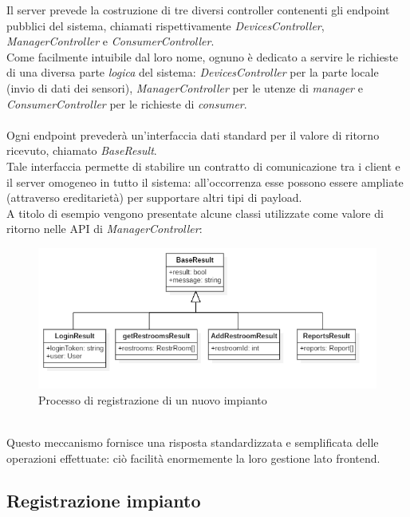 \documentclass[12pt]{article}
\begin{document}
Il server prevede la costruzione di tre diversi controller contenenti gli endpoint pubblici del sistema, chiamati rispettivamente \textit{DevicesController}, \textit{ManagerController} e \textit{ConsumerController}.\\
Come facilmente intuibile dal loro nome, ognuno è dedicato a servire le richieste di una diversa parte \textit{logica} del sistema: \textit{DevicesController} per la parte locale (invio di dati dei sensori), \textit{ManagerController} per le utenze di \textit{manager} e \textit{ConsumerController} per le richieste di \textit{consumer}.\\\\
Ogni endpoint prevederà un'interfaccia dati standard per il valore di ritorno ricevuto, chiamato \textit{BaseResult}.\\
Tale interfaccia permette di stabilire un contratto di comunicazione tra i client e il server omogeneo in tutto il sistema: all'occorrenza esse possono essere ampliate (attraverso ereditarietà) per supportare altri tipi di payload.\\
\newpage
A titolo di esempio vengono presentate alcune classi utilizzate come valore di ritorno nelle API di \textit{ManagerController}:
\begin{figure}[h!]
\centering
  \includegraphics[scale=0.60]{img/classeBaseResult.png}
  \caption{Processo di registrazione di un nuovo impianto}
\end{figure}
\\Questo meccanismo fornisce una risposta standardizzata e semplificata delle operazioni effettuate: ciò facilità enormemente la loro gestione lato frontend.
\newpage
\subsection{Registrazione impianto}
\end{document}
